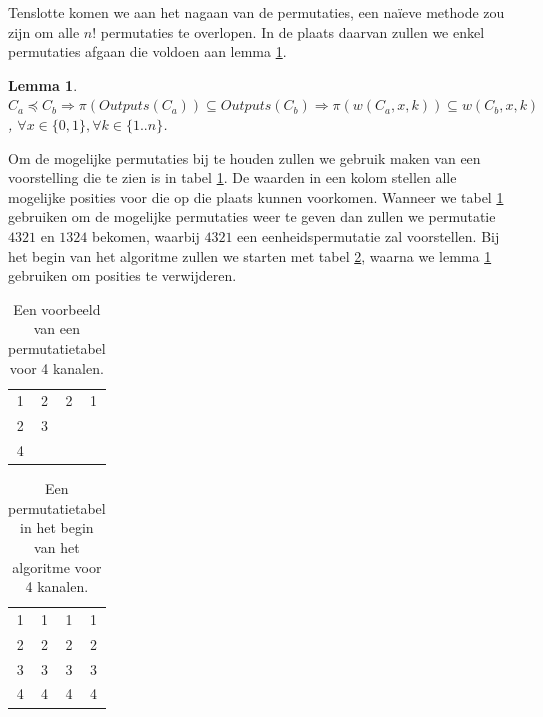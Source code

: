 \documentclass{article}
\newtheorem{lemma}{Lemma}
\begin{document}
Tenslotte komen we aan het nagaan van de permutaties, een na\"ieve methode zou zijn om alle $n!$ permutaties te overlopen.
In de plaats daarvan zullen we enkel permutaties afgaan die voldoen aan lemma \ref{lemma5}.
\begin{lemma}
	${C_a \preceq C_b  \Rightarrow \pi\left(Outputs\left(C_{a}\right)\right) \subseteq Outputs\left(C_{b}\right)} \Rightarrow \pi\left(w\left(C_a, x, k\right)\right) \subseteq w\left(C_b, x, k\right)$, ${\forall x \in \{0,1\}, \forall k \in \{1..n\}}$.
\label{lemma5}
\end{lemma} 
Om de mogelijke permutaties bij te houden zullen we gebruik maken van een voorstelling die te zien is in tabel \ref{tabel4}.
De waarden in een kolom stellen alle mogelijke posities voor die op die plaats kunnen voorkomen.
Wanneer we tabel  \ref{tabel4} gebruiken om de mogelijke permutaties weer te geven dan zullen we permutatie $4321$ en $1324$  bekomen, waarbij $4321$ een eenheidspermutatie zal voorstellen.
Bij het begin van het algoritme zullen we starten met tabel \ref{tabel5}, waarna we lemma \ref{lemma5} gebruiken om posities te verwijderen.
\begin{table}[!h]
	\centering
	\begin{tabular}{|c|c|c|c|}
	\hline
	1 & 2 & 2 & 1 \\ 
	2 & 3 &  &  \\ 
	4 &  &  &  \\ 
	\hline 
	\end{tabular}
	\caption{Een voorbeeld van een permutatietabel voor 4 kanalen.}
	\label{tabel4}
\end{table}
\begin{table}[!h]
	\centering
	\begin{tabular}{|c|c|c|c|}
	\hline
	1 & 1 & 1 & 1 \\ 
	2 & 2 & 2 & 2\\ 
	3 & 3 & 3 & 3 \\
	4 & 4 & 4 & 4\\ 
	\hline 
	\end{tabular}
	\caption{Een permutatietabel in het begin van het algoritme voor 4 kanalen.}
\label{tabel5}
\end{table}
\end{document}
